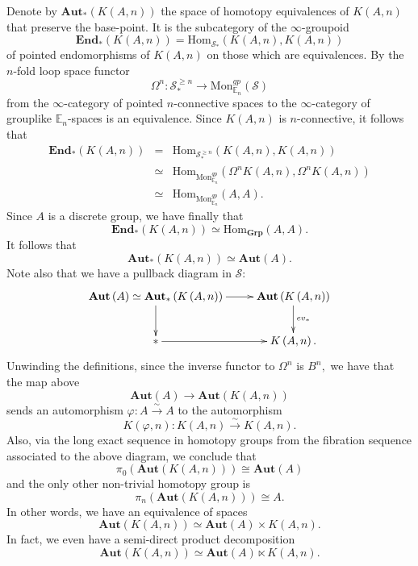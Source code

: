 \documentclass[12pt]{amsart}
\theoremstyle{definition}
\newcommand{\cS}{\mathcal{S}}
\newcommand{\Hom}{\mathrm{Hom}}
\renewcommand{\i}{\infty}
\def\Aut{\mathbf{Aut}}
\begin{document}
Denote by $\Aut_*\left(K\left(A,n\right)\right)$ the space of homotopy equivalences of $K\left(A,n\right)$ that preserve the base-point. It is the subcategory of the $\i$-groupoid $$\mathbf{End}_*\left(K\left(A,n\right)\right)=\Hom_{\cS_*}\left(K\left(A,n\right),K\left(A,n\right)\right)$$ of pointed endomorphisms of $K\left(A,n\right)$ on those which are equivalences. By \cite[Theorem 5.1.3.6]{higheralgebra} the $n$-fold loop space functor $$\Omega^n:\cS_{*}^{\ge n} \to \mbox{Mon}^{gp}_{\mathbb{E}_n}\left(\cS\right)$$ from the $\i$-category of pointed $n$-connective spaces to the $\i$-category of grouplike $\mathbb{E}_n$-spaces is an equivalence. Since $K\left(A,n\right)$ is $n$-connective, it follows that 
\begin{eqnarray*}
\mathbf{End}_*\left(K\left(A,n\right)\right)&=& \Hom_{\cS_{*}^{\ge n}}\left(K\left(A,n\right),K\left(A,n\right)\right)\\
&\simeq& \Hom_{\mbox{Mon}^{gp}_{\mathbb{E}_n}}\left(\Omega^n K\left(A,n\right),\Omega^n K\left(A,n\right)\right)\\
&\simeq& \Hom_{\mbox{Mon}^{gp}_{\mathbb{E}_n}}\left(A,A\right).
\end{eqnarray*}
Since $A$ is a discrete group, we have finally that $$\mathbf{End}_*\left(K\left(A,n\right)\right)\simeq \Hom_{\textbf{Grp}}\left(A,A\right).$$ It follows that $$\Aut_*\left(K\left(A,n\right)\right)\simeq \Aut\left(A\right).$$ 
Note also that we have a pullback diagram in $\cS$:
$$\xymatrix{\Aut\left(A\right) \simeq \Aut_\ast\left(K\left(A,n\right)\right) \ar[r] \ar[d] & \Aut\left(K\left(A,n\right)\right) \ar[d]^-{ev_\ast}\\
\ast \ar[r] & K\left(A,n\right).}$$
Unwinding the definitions, since the inverse functor to $\Omega^n$ is $B^n,$ we have that the map above $$\Aut\left(A\right) \to \Aut\left(K\left(A,n\right)\right)$$ sends an automorphism $\varphi:A \stackrel{\sim}{\longrightarrow} A$ to the automorphism $$K\left(\varphi,n\right):K\left(A,n\right) \stackrel{\sim}{\longrightarrow} K\left(A,n\right).$$ Also, via the long exact sequence in homotopy groups from the fibration sequence associated to the above diagram, we conclude that 
$$\pi_0\left(\Aut\left(K\left(A,n\right)\right)\right)\cong \Aut\left(A\right)$$ and the only other non-trivial homotopy group is $$\pi_n\left(\Aut\left(K\left(A,n\right)\right)\right)\cong A.$$ In other words, we have an equivalence of spaces
$$\Aut\left(K\left(A,n\right)\right) \simeq \Aut\left(A\right) \times K\left(A,n\right).$$
In fact, we even have a semi-direct product decomposition $$\Aut\left(K\left(A,n\right)\right) \simeq \Aut\left(A\right)\ltimes K\left(A,n\right).$$
\end{document}
